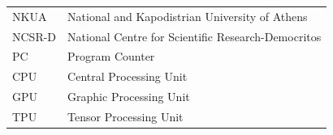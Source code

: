 \documentclass[ack,preface]{dithesis}
\begin{document}
\backmatter

\abbreviations
\begin{center}
	\renewcommand{\arraystretch}{1.5}
	\begin{longtable}{ l @{\qquad} l }
	\toprule
	NKUA    & National and Kapodistrian University of Athens\\
	NCSR-D & National Centre for Scientific Research-Democritos \\
	PC & Program Counter \\
	CPU & Central Processing Unit\\
	GPU & Graphic Processing Unit\\
	TPU & Tensor Processing Unit\\
	\bottomrule
	\end{longtable}
\end{center}







\end{document}
